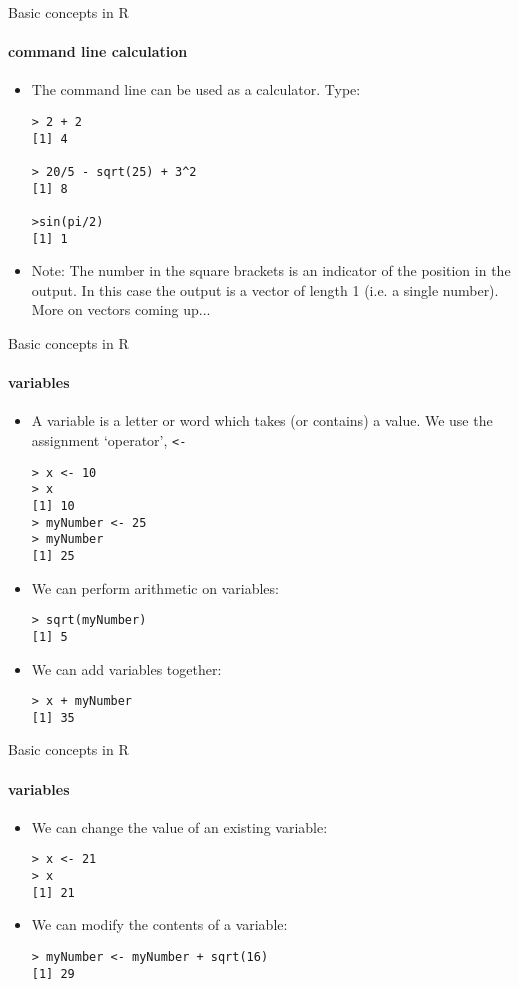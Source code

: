 \documentclass{beamer}
\begin{document}
\begin{frame}[fragile]{Basic concepts in R}
    \framesubtitle{command line calculation}
    \begin{itemize}
        \item The command line can be used as a calculator. Type:
        \begin{verbatim}
> 2 + 2
[1] 4

> 20/5 - sqrt(25) + 3^2
[1] 8

>sin(pi/2)
[1] 1\end{verbatim}
        \item Note: The number in the square brackets is an indicator of the position in the output. In this case the output is a vector of length 1 (i.e. a single number). More on vectors coming up...
    \end{itemize}
\end{frame}

\begin{frame}[fragile]{Basic concepts in R}
    \framesubtitle{variables}
    \begin{itemize}
        \item A variable is a letter or word which takes (or contains) a value. We use the assignment `operator', {\tt <-}
        \begin{verbatim}
> x <- 10
> x
[1] 10
> myNumber <- 25
> myNumber
[1] 25 \end{verbatim}
\item We can perform arithmetic on variables:
\begin{verbatim}
> sqrt(myNumber)
[1] 5\end{verbatim}
\item We can add variables together:
\begin{verbatim}
> x + myNumber
[1] 35\end{verbatim}
    \end{itemize}
\end{frame}

\begin{frame}[fragile]{Basic concepts in R}
    \framesubtitle{variables}
    \begin{itemize}
        \item We can change the value of an existing variable:
        \begin{verbatim}
> x <- 21
> x
[1] 21\end{verbatim}
        \item We can modify the contents of a variable:
\begin{verbatim}
> myNumber <- myNumber + sqrt(16)
[1] 29\end{verbatim}
    \end{itemize}
\end{frame}
\end{document}
